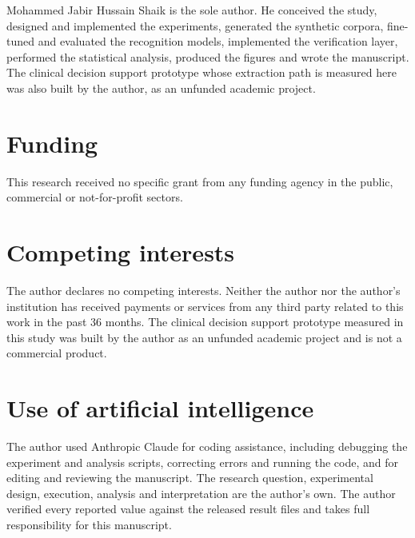 \documentclass[11pt]{article}
\begin{document}
Mohammed Jabir Hussain Shaik is the sole author. He conceived the study, designed and implemented the experiments,
generated the synthetic corpora, fine-tuned and evaluated the recognition models, implemented
the verification layer, performed the statistical analysis, produced the figures and wrote the
manuscript. The clinical decision support prototype whose extraction path is measured here was
also built by the author, as an unfunded academic project.

\section*{Funding}

This research received no specific grant from any funding agency in the public, commercial or
not-for-profit sectors.

\section*{Competing interests}

The author declares no competing interests. Neither the author nor the author's institution has
received payments or services from any third party related to this work in the past 36 months.
The clinical decision support prototype measured in this study was built by the author as an
unfunded academic project and is not a commercial product.

\section*{Use of artificial intelligence}

The author used Anthropic Claude for coding assistance, including debugging the experiment and
analysis scripts, correcting errors and running the code, and for editing and reviewing the
manuscript. The research question, experimental design, execution, analysis and interpretation
are the author's own. The author verified every reported value against the released result files
and takes full responsibility for this manuscript.
\end{document}
